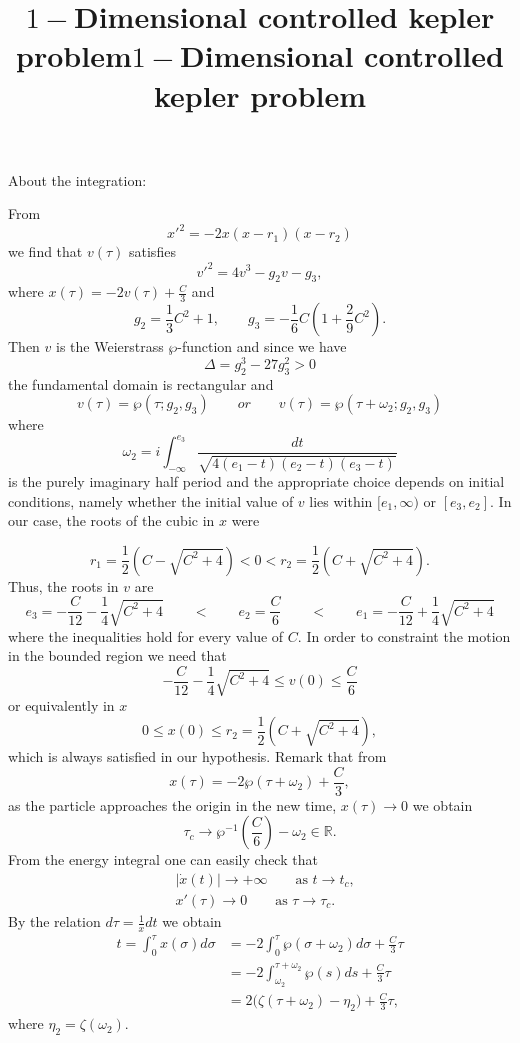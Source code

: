 \documentclass{article}
\title{$1-$Dimensional controlled kepler problem}
\begin{document}
\title{$1-$Dimensional controlled kepler problem}


\section{}
About the integration:

From
$$
x'^2 = -2x(x-r_1)(x-r_2)
$$
we find that $v(\tau)$ satisfies 
$$
v'^2 = 4v^3 - g_2 v - g_3,
$$
where  $x(\tau) = -2v(\tau) + \frac{C}{3}$ and
 $$
g_2 = \frac{1}{3}C^2 +1, \qquad  g_3 =- \frac{1}{6}C(1+\frac{2}{9}C^2).
 $$
 Then $v$ is the Weierstrass $\wp$-function and since we have
 $$
\Delta = g_2^3 - 27 g_3^2 > 0
 $$
the fundamental domain is rectangular and
 $$
v(\tau) = \wp(\tau; g_2,g_3) \qquad or \qquad v(\tau) = \wp(\tau+\omega_2; g_2,g_3) 
 $$
where 
\[
\omega_2 = i\int_{-\infty}^{e_3}\frac{dt}{\sqrt{4(e_1-t)(e_2-t)(e_3-t)}}
\]
is the purely imaginary half period and the appropriate choice depends on initial conditions, namely whether the initial value of $v$ lies within $[e_1, \infty)$ or $[e_3, e_2]$.
In our case, the roots of the cubic in $x$ were

 $$
r_1 = \frac{1}{2}(C-\sqrt{C^2+4}) <  0 < r_2 = \frac{1}{2}(C+\sqrt{C^2+4}).
 $$
Thus, the roots in $v$ are
 $$
e_3 = -\frac{C}{12} - \frac{1}{4}\sqrt{C^2+4} \qquad < \qquad e_2 =  \frac{C}{6} \qquad < \qquad e_1 =-\frac{C}{12} + \frac{1}{4}\sqrt{C^2+4}
 $$
where the inequalities hold for every value of $C$.
In order to constraint the motion in the bounded region we need that
 $$
-\frac{C}{12} - \frac{1}{4}\sqrt{C^2+4}  \leq v(0) \leq  \frac{C}{6} 
 $$
or equivalently in $x$
 $$
0 \leq x(0) \leq  r_2 = \frac{1}{2}(C+\sqrt{C^2+4}),
$$
which is always satisfied in our hypothesis. Remark that from
\[
x(\tau) = -2\wp(\tau+\omega_2)+\frac{C}{3},
\]
as the particle approaches the origin in the new time, $x(\tau) \to 0$ we obtain
\[
\tau_c \to \wp^{-1}(\frac{C}{6})-\omega_2 \in \mathds{R}.
\]
From the energy integral one can easily check that
\begin{equation*}
\begin{split}
&|\dot x(t)| \longrightarrow +\infty \qquad \text{as } t \to t_c, \\
& x'(\tau) \longrightarrow 0 \qquad \text{as } \tau  \to \tau_c.
 \end{split}
\end{equation*}
By the relation $d\tau = \frac{1}{x} dt$ we obtain
\begin{equation*}
    \begin{split}
        t = \int_{0}^{\tau} x(\sigma) d\sigma 
         &= -2\int_{0}^{\tau} \wp(\sigma + \omega_2) d\sigma + \frac{C}{3}\tau \\
         &= -2\int_{\omega_2}^{\tau+\omega_2} \wp(s)ds + \frac{C}{3}\tau \\
         &= 2\big(\zeta(\tau + \omega_2) - \eta_2\big) + \frac{C}{3}\tau,
    \end{split}
\end{equation*}
where $\eta_2 = \zeta(\omega_2)$.
 
\end{document}

